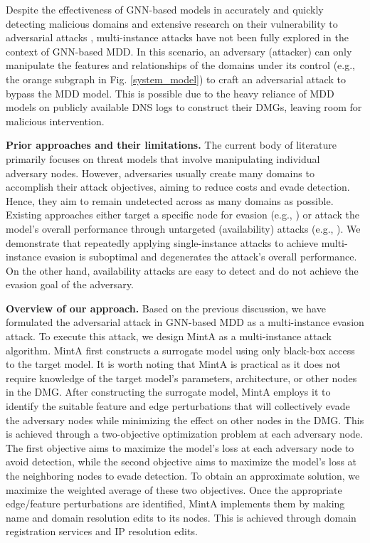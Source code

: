 \documentclass[conference,compsoc]{IEEEtran}
\begin{document}
\par Despite the effectiveness of GNN-based models in accurately and quickly detecting malicious domains and extensive research on their vulnerability to adversarial attacks \cite{dai2018adversarial,zugner2018adversarial,zang2020graph}, multi-instance attacks have not been fully explored in the context of GNN-based MDD. In this scenario, an adversary (attacker) can only manipulate the features and relationships of the domains under its control (e.g., the orange subgraph in Fig. \ref{system_model}) to craft an adversarial attack to bypass the MDD model. This is possible due to the heavy reliance of MDD models on publicly available DNS logs to construct their DMGs, leaving room for malicious intervention.

\par \textbf{Prior approaches and their limitations.} The current body of literature primarily focuses on threat models that involve manipulating individual adversary nodes. However, adversaries usually create many domains to accomplish their attack objectives, aiming to reduce costs and evade detection. Hence, they aim to remain undetected across as many domains as possible. Existing approaches either target a specific node for evasion (e.g., \cite{dai2018adversarial,chen2018fast,wu2019adversarial,zugner2018adversarial,chang2020restricted,wang2020evasion})  or attack the model's overall performance through untargeted (availability) attacks (e.g., \cite{xu2019topology,ma2019attacking,ma2020towards,ma2022adversarial}). We demonstrate that repeatedly applying single-instance attacks to achieve multi-instance evasion is suboptimal and degenerates the attack's overall performance. On the other hand, availability attacks are easy to detect and do not achieve the evasion goal of the adversary.

\par \textbf{Overview of our approach.} Based on the previous discussion, we have formulated the adversarial attack in GNN-based MDD as a multi-instance evasion attack. To execute this attack, we design MintA as a multi-instance attack algorithm. MintA first constructs a surrogate model using only black-box access to the target model. It is worth noting that MintA is practical as it does not require knowledge of the target model's parameters, architecture, or other nodes in the DMG. After constructing the surrogate model, MintA employs it to identify the suitable feature and edge perturbations that will collectively evade the adversary nodes while minimizing the effect on other nodes in the DMG. This is achieved through a two-objective optimization problem at each adversary node. The first objective aims to maximize the model's loss at each adversary node to avoid detection, while the second objective aims to maximize the model's loss at the neighboring nodes to evade detection. To obtain an approximate solution, we maximize the weighted average of these two objectives. Once the appropriate edge/feature perturbations are identified, MintA implements them by making name and domain resolution edits to its nodes. This is achieved through domain registration services and IP resolution edits. 
\end{document}

